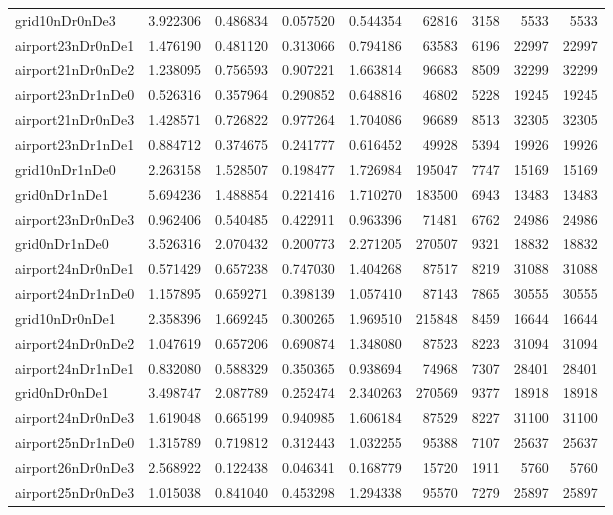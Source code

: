 \begin{longtable}{|l|r|r|r|r|r|r|r|r|}
grid10nDr0nDe3 & 3.922306 & 0.486834 & 0.057520 & 0.544354 & 62816 & 3158 & 5533 & 5533 \\
airport23nDr0nDe1 & 1.476190 & 0.481120 & 0.313066 & 0.794186 & 63583 & 6196 & 22997 & 22997 \\
airport21nDr0nDe2 & 1.238095 & 0.756593 & 0.907221 & 1.663814 & 96683 & 8509 & 32299 & 32299 \\
airport23nDr1nDe0 & 0.526316 & 0.357964 & 0.290852 & 0.648816 & 46802 & 5228 & 19245 & 19245 \\
airport21nDr0nDe3 & 1.428571 & 0.726822 & 0.977264 & 1.704086 & 96689 & 8513 & 32305 & 32305 \\
airport23nDr1nDe1 & 0.884712 & 0.374675 & 0.241777 & 0.616452 & 49928 & 5394 & 19926 & 19926 \\
grid10nDr1nDe0 & 2.263158 & 1.528507 & 0.198477 & 1.726984 & 195047 & 7747 & 15169 & 15169 \\
grid0nDr1nDe1 & 5.694236 & 1.488854 & 0.221416 & 1.710270 & 183500 & 6943 & 13483 & 13483 \\
airport23nDr0nDe3 & 0.962406 & 0.540485 & 0.422911 & 0.963396 & 71481 & 6762 & 24986 & 24986 \\
grid0nDr1nDe0 & 3.526316 & 2.070432 & 0.200773 & 2.271205 & 270507 & 9321 & 18832 & 18832 \\
airport24nDr0nDe1 & 0.571429 & 0.657238 & 0.747030 & 1.404268 & 87517 & 8219 & 31088 & 31088 \\
airport24nDr1nDe0 & 1.157895 & 0.659271 & 0.398139 & 1.057410 & 87143 & 7865 & 30555 & 30555 \\
grid10nDr0nDe1 & 2.358396 & 1.669245 & 0.300265 & 1.969510 & 215848 & 8459 & 16644 & 16644 \\
airport24nDr0nDe2 & 1.047619 & 0.657206 & 0.690874 & 1.348080 & 87523 & 8223 & 31094 & 31094 \\
airport24nDr1nDe1 & 0.832080 & 0.588329 & 0.350365 & 0.938694 & 74968 & 7307 & 28401 & 28401 \\
grid0nDr0nDe1 & 3.498747 & 2.087789 & 0.252474 & 2.340263 & 270569 & 9377 & 18918 & 18918 \\
airport24nDr0nDe3 & 1.619048 & 0.665199 & 0.940985 & 1.606184 & 87529 & 8227 & 31100 & 31100 \\
airport25nDr1nDe0 & 1.315789 & 0.719812 & 0.312443 & 1.032255 & 95388 & 7107 & 25637 & 25637 \\
airport26nDr0nDe3 & 2.568922 & 0.122438 & 0.046341 & 0.168779 & 15720 & 1911 & 5760 & 5760 \\
airport25nDr0nDe3 & 1.015038 & 0.841040 & 0.453298 & 1.294338 & 95570 & 7279 & 25897 & 25897 \\

\end{longtable}
